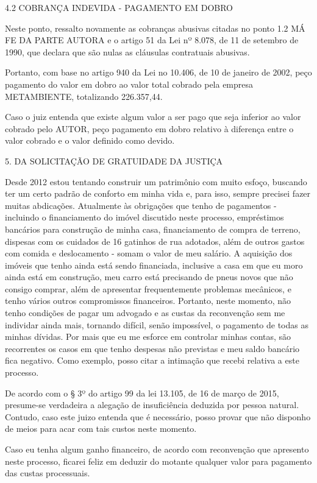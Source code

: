 \documentclass[11pt]{letter}
\begin{document}
4.2 COBRANÇA INDEVIDA - PAGAMENTO EM DOBRO

Neste ponto, ressalto novamente as cobranças abusivas citadas no ponto 1.2 MÁ FE DA PARTE AUTORA e o artigo 51 da Lei nº 8.078, de 11 de setembro de 1990, que declara que são nulas as cláusulas contratuais abusivas. 

Portanto, com base no artigo 940 da Lei no 10.406, de 10 de janeiro de 2002, peço pagamento do valor em dobro ao valor total cobrado pela empresa METAMBIENTE, totalizando 226.357,44.

Caso o juiz entenda que existe algum valor a ser pago que seja inferior ao valor cobrado pelo AUTOR, peço pagamento em dobro relativo à diferença entre o valor cobrado e o valor definido como devido. 

5. DA SOLICITAÇÃO DE GRATUIDADE DA JUSTIÇA

Desde 2012 estou tentando construir um patrimônio com muito esfoço, buscando ter um certo padrão de conforto em minha vida e, para isso, sempre precisei fazer muitas abdicações. Atualmente às obrigações que tenho de pagamentos - incluindo o financiamento do imóvel discutido neste processo, empréstimos bancários para construção de minha casa, financiamento de compra de terreno, dispesas com os cuidados de 16 gatinhos de rua adotados, além de outros gastos com comida e deslocamento - somam o valor de meu salário. A aquisição dos imóveis que tenho ainda está sendo financiada, inclusive a casa em que eu moro ainda está em construção, meu carro está precisando de pneus novos que não consigo comprar, além de apresentar frequentemente problemas mecânicos, e tenho vários outros compromissos financeiros. Portanto, neste momento, não tenho condições de pagar um advogado e as custas da reconvenção sem me individar ainda mais, tornando difícil, senão impossível, o pagamento de todas as minhas dívidas. Por mais que eu me esforce em controlar minhas contas, são recorrentes os casos em que tenho despesas não previstas e meu saldo bancário fica negativo. Como exemplo, posso citar a intimação que recebi relativa a este processo.

De acordo com o § 3º do artigo 99 da lei 13.105, de 16 de março de 2015, presume-se verdadeira a alegação de insuficiência deduzida por pessoa natural. Contudo, caso este juizo entenda que é necessário, posso provar que não disponho de meios para acar com tais custos neste momento.

Caso eu tenha algum ganho financeiro, de acordo com reconvenção que apresento neste processo, ficarei feliz em deduzir do motante qualquer valor para pagamento das custas processuais.
\end{document}
